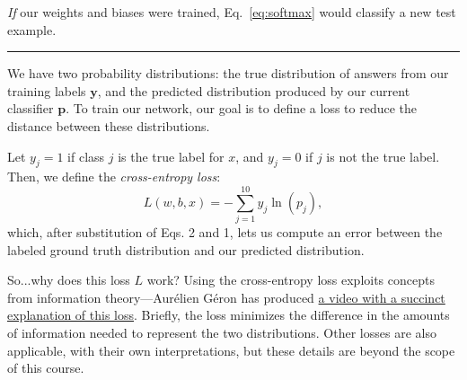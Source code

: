 \emph{If} our weights and biases were trained, Eq.~\ref{eq:softmax} would classify a new test example.

\hspace{\fill}\rule{0.5\linewidth}{.5pt}\hspace{\fill}

We have two probability distributions: the true distribution of answers from our training labels $\mathbf{y}$, and the predicted distribution produced by our current classifier $\mathbf{p}$. To train our network, our goal is to define a loss to reduce the distance between these distributions.

Let $y_j=1$ if class $j$ is the true label for $x$, and $y_j = 0$ if $j$ is not the true label. Then, we define the \emph{cross-entropy loss}:
\begin{equation}
    L(w,b,x) = - \sum_{j=1}^{10}y_j\ln(p_j),
\end{equation}
which, after substitution of Eqs. 2 and 1, lets us compute an error between the labeled ground truth distribution and our predicted distribution.

So...why does this loss $L$ work? Using the cross-entropy loss exploits concepts from information theory---Aur\'{e}lien G\'{e}ron has produced \href{https://www.youtube.com/watch?v=ErfnhcEV1O8}{a video with a succinct explanation of this loss}. Briefly, the loss minimizes the difference in the amounts of information needed to represent the two distributions. Other losses are also applicable, with their own interpretations, but these details are beyond the scope of this course.


